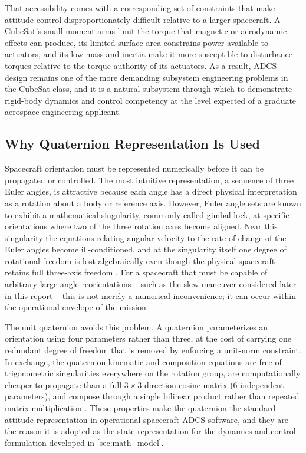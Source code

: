 That accessibility comes with a corresponding set of constraints that make attitude control disproportionately difficult relative to a larger spacecraft. A CubeSat's small moment arms limit the torque that magnetic or aerodynamic effects can produce, its limited surface area constrains power available to actuators, and its low mass and inertia make it more susceptible to disturbance torques relative to the torque authority of its actuators. As a result, ADCS design remains one of the more demanding subsystem engineering problems in the CubeSat class, and it is a natural subsystem through which to demonstrate rigid-body dynamics and control competency at the level expected of a graduate aerospace engineering applicant.

\subsection{Why Quaternion Representation Is Used}
\label{sec:why_quaternions}

Spacecraft orientation must be represented numerically before it can be propagated or controlled. The most intuitive representation, a sequence of three Euler angles, is attractive because each angle has a direct physical interpretation as a rotation about a body or reference axis. However, Euler angle sets are known to exhibit a mathematical singularity, commonly called gimbal lock, at specific orientations where two of the three rotation axes become aligned. Near this singularity the equations relating angular velocity to the rate of change of the Euler angles become ill-conditioned, and at the singularity itself one degree of rotational freedom is lost algebraically even though the physical spacecraft retains full three-axis freedom \cite{shuster1993}. For a spacecraft that must be capable of arbitrary large-angle reorientations -- such as the slew maneuver considered later in this report -- this is not merely a numerical inconvenience; it can occur within the operational envelope of the mission.

The unit quaternion avoids this problem. A quaternion parameterizes an orientation using four parameters rather than three, at the cost of carrying one redundant degree of freedom that is removed by enforcing a unit-norm constraint. In exchange, the quaternion kinematic and composition equations are free of trigonometric singularities everywhere on the rotation group, are computationally cheaper to propagate than a full $3\times3$ direction cosine matrix (6 independent parameters), and compose through a single bilinear product rather than repeated matrix multiplication \cite{markley2014, wie1985}. These properties make the quaternion the standard attitude representation in operational spacecraft ADCS software, and they are the reason it is adopted as the state representation for the dynamics and control formulation developed in \cref{sec:math_model}.

